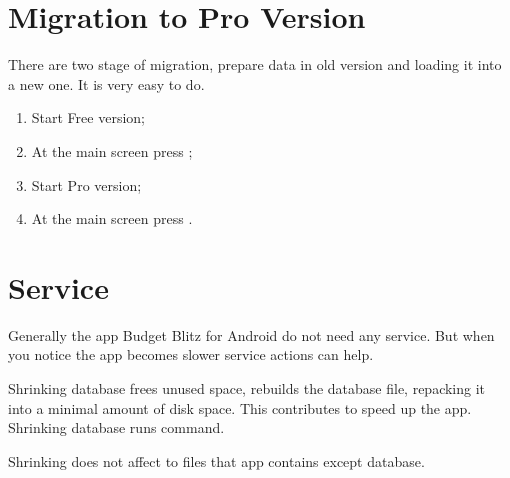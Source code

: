 \documentclass[a4paper,10pt,english]{sphinxmanual}
\begin{document}


\chapter{Migration to Pro Version}
\label{\detokenize{migration-to-pro:migration-to-pro-version}}\label{\detokenize{migration-to-pro:chapter-migration-to-pro}}\label{\detokenize{migration-to-pro::doc}}
There are two stage of migration, prepare data in old version and loading it into a new one.
It is very easy to do.
\begin{enumerate}
\def\theenumi{\arabic{enumi}}
\def\labelenumi{\theenumi .}
\makeatletter\def\p@enumii{\p@enumi \theenumi .}\makeatother
\item {} 
Start Free version;

\item {} 
At the main screen press ;

\item {} 
Start Pro version;

\item {} 
At the main screen press .

\end{enumerate}


\chapter{Service}
\label{\detokenize{service:service}}\label{\detokenize{service:chapter-service}}\label{\detokenize{service::doc}}
Generally the app Budget Blitz for Android do not need any service. But when you notice
the app becomes slower service actions can help.

\noindent{}
\noindent{}
\noindent{}

Shrinking database frees unused space, rebuilds the database file, repacking it into a minimal
amount of disk space. This contributes to speed up the app. Shrinking database runs
 command.

Shrinking does not affect to files that app contains except database.
\end{document}
